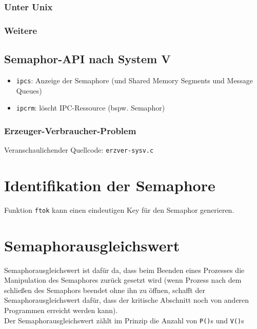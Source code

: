 \subsubsection*{Unter Unix}
\subsubsection*{Weitere}
\subsection{Semaphor-API nach System V}
\begin{itemize}
\item \lstinline$ipcs$: Anzeige der Semaphore (und Shared Memory Segments und Message Queues)
\item \lstinline$ipcrm$: löscht IPC-Ressource (bspw. Semaphor)
\end{itemize}

\subsubsection{Erzeuger-Verbraucher-Problem}
Veranschaulichender Quellcode: \lstinline$erzver-sysv.c$

\section{Identifikation der Semaphore}
Funktion \lstinline$ftok$ kann einen eindeutigen Key für den Semaphor generieren.

\section{Semaphorausgleichswert}
Semaphorausgleichswert ist dafür da, dass beim Beenden eines Prozesses die Manipulation des Semaphores zurück gesetzt wird (wenn Prozess nach dem schließen des Semaphors beendet ohne ihn zu öffnen, schafft der Semaphorausgleichswert dafür, dass der kritische Abschnitt noch von anderen Programmen erreicht werden kann).\\
Der Semaphorausgleichswert zählt im Prinzip die Anzahl von \lstinline$P()$s und \lstinline$V()$s
























